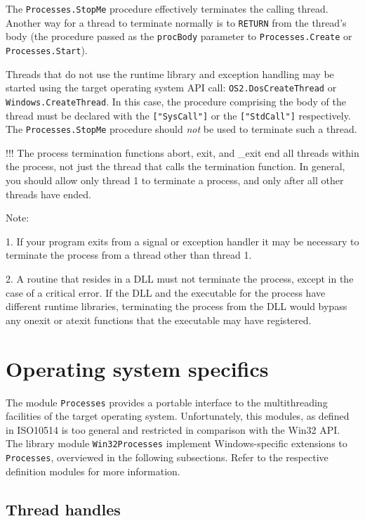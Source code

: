 The \verb'Processes.StopMe' procedure effectively terminates
the calling thread. %
Another way for a thread to terminate normally is to \verb'RETURN'
from the thread's body (the procedure passed as the \verb'procBody'
parameter to \verb'Processes.Create' or \verb'Processes.Start').

Threads that do not use the runtime library and exception handling
may be started using the target operating system API call:
\verb'OS2.DosCreateThread' or \verb'Windows.CreateThread'. In this
case, the procedure comprising the body of the thread must be
declared with the \verb'["SysCall"]' or the \verb'["StdCall"]'
 respectively.
The \verb'Processes.StopMe' procedure should {\em not} be used
to terminate such a thread.

\ifcomment !!!
 The process termination functions abort, exit, and _exit end all threads within the process, not just the
 thread that calls the termination function.  In general, you should allow only thread 1 to terminate a process,
 and only after all other threads have ended.

 Note:

    1. If your program exits from a signal or exception handler it may be necessary to terminate the process from
       a thread other than thread 1.

    2. A routine that resides in a DLL must not terminate the process, except in the case of a critical error.  If
       the DLL and the executable for the process have different runtime libraries, terminating the process from
       the DLL would bypass any onexit or atexit functions that the executable may have registered.
\fi

\section{Operating system specifics}

The module \verb'Processes' provides a portable interface to the multithreading
facilities of the target operating system. Unfortunately, this modules, as
defined in ISO10514 is too general and restricted in comparison with the Win32
API. The \XDS{} library module \verb'Win32Processes' implement Windows-specific 
extensions to 
\verb'Processes', overviewed in the following subsections. Refer
to the respective definition modules for more information.

\subsection{Thread handles}

